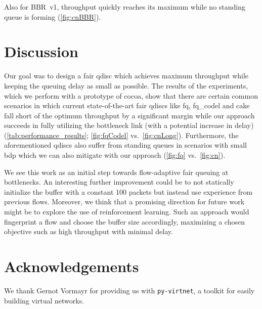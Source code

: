 \documentclass[10pt,sigconf,letterpaper,dvipsnames\ifx\removeHeaders\tempYes ,nonacm\fi]{acmart}
\begin{document}
Also for BBR~v1, throughput quickly reaches its maximum while no standing queue is forming (\autoref{fig:cnBBR}). 

\section{Discussion}

Our goal was to design a fair \gls{qdisc} which achieves maximum throughput while keeping the queuing delay as small as possible. The results of the experiments, which we perform with a prototype of \gls{cocoa}, show that there are certain common scenarios in which current state-of-the-art fair \glspl{qdisc} like fq, fq\_codel and cake fall short of the optimum throughput by a significant margin while our approach succeeds in fully utilizing the bottleneck link (with a potential increase in delay) (\autoref{tab:performance_results}; \autoref{fig:fqCodel} vs.~\autoref{fig:cnLong}). Furthermore, the aforementioned \glspl{qdisc} also suffer from standing queues in scenarios with small \gls{bdp} which we can also mitigate with our approach (\autoref{fig:fq} vs.~\autoref{fig:cn}). 

We see this work as an initial step towards flow-adaptive fair queuing at bottlenecks. An interesting further improvement could be to not statically initialize the buffer with a constant 100 packets but instead use experience from previous flows. Moreover, we think that a promising direction for future work might be to explore the use of reinforcement learning. Such an approach would fingerprint a flow and choose the buffer size accordingly, maximizing a chosen objective such as high throughput with minimal delay. 

\section*{Acknowledgements}
We thank Gernot Vormayr for providing us with \texttt{py-virtnet}, a toolkit for easily building virtual networks. 



\end{document}
